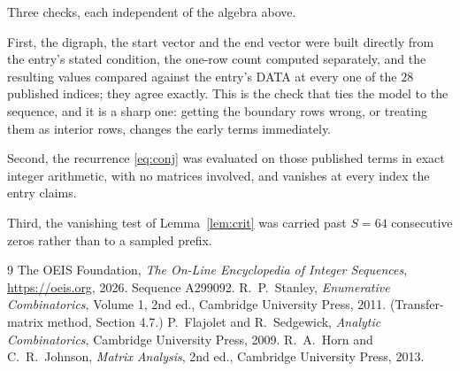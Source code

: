 \documentclass[11pt,a4paper]{article}
\theoremstyle{plain}
\theoremstyle{definition}
\begin{document}
Three checks, each independent of the algebra above.

First, the digraph, the start vector and the end vector were built directly from the
entry's stated condition, the one-row count computed separately, and the resulting values
compared against the entry's DATA at every one of the $28$ published indices; they
agree exactly. This is the check that ties the model to the sequence, and it is a sharp one:
getting the boundary rows wrong, or treating them as interior rows, changes the early terms
immediately.

Second, the recurrence \eqref{eq:conj} was evaluated on those published terms in exact
integer arithmetic, with no matrices involved, and vanishes at every index the entry claims.

Third, the vanishing test of Lemma~\ref{lem:crit} was carried past $S=64$ consecutive
zeros rather than to a sampled prefix.

\begin{thebibliography}{9}
 The OEIS Foundation, \emph{The On-Line Encyclopedia of Integer
Sequences}, \url{https://oeis.org}, 2026. Sequence A299092.
 R.~P.~Stanley, \emph{Enumerative Combinatorics}, Volume 1, 2nd ed.,
Cambridge University Press, 2011. (Transfer-matrix method, Section 4.7.)
 P.~Flajolet and R.~Sedgewick, \emph{Analytic Combinatorics}, Cambridge
University Press, 2009.
 R.~A.~Horn and C.~R.~Johnson, \emph{Matrix Analysis}, 2nd ed., Cambridge
University Press, 2013.
\end{thebibliography}
\end{document}
